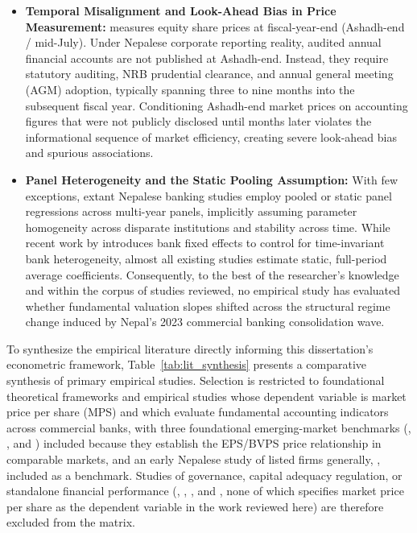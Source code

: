 \begin{itemize}
\item \textbf{Temporal Misalignment and Look-Ahead Bias in Price Measurement:}
\citet{bhattarai2014} measures equity share prices at fiscal-year-end (Ashadh-end / mid-July). Under Nepalese corporate reporting reality, audited annual financial accounts are not published at Ashadh-end. Instead, they require statutory auditing, NRB prudential clearance, and annual general meeting (AGM) adoption, typically spanning three to nine months into the subsequent fiscal year. Conditioning Ashadh-end market prices on accounting figures that were not publicly disclosed until months later violates the informational sequence of market efficiency, creating severe look-ahead bias and spurious associations.

\item \textbf{Panel Heterogeneity and the Static Pooling Assumption:}
With few exceptions, extant Nepalese banking studies employ pooled or static panel regressions across multi-year panels, implicitly assuming parameter homogeneity across disparate institutions and stability across time. While recent work by \citet{gurungdahal2025} introduces bank fixed effects to control for time-invariant bank heterogeneity, almost all existing studies estimate static, full-period average coefficients. Consequently, to the best of the researcher's knowledge and within the corpus of studies reviewed, no empirical study has evaluated whether fundamental valuation slopes shifted across the structural regime change induced by Nepal's 2023 commercial banking consolidation wave.
\end{itemize}

To synthesize the empirical literature directly informing this dissertation's econometric framework, Table~\ref{tab:lit_synthesis} presents a comparative synthesis of primary empirical studies. Selection is restricted to foundational theoretical frameworks and empirical studies whose dependent variable is market price per share (MPS) and which evaluate fundamental accounting indicators across commercial banks, with three foundational emerging-market benchmarks (\citet{sharma2011}, \citet{malhotra2013}, and \citet{almumani2014}) included because they establish the EPS/BVPS price relationship in comparable markets, and an early Nepalese study of listed firms generally, \citet{pradhan2003}, included as a benchmark. Studies of governance, capital adequacy regulation, or standalone financial performance (\citet{bhattarai2024}, \citet{dongol2024}, \citet{adhikari2023cbr}, and \citet{acharya2026merger}, none of which specifies market price per share as the dependent variable in the work reviewed here) are therefore excluded from the matrix.

